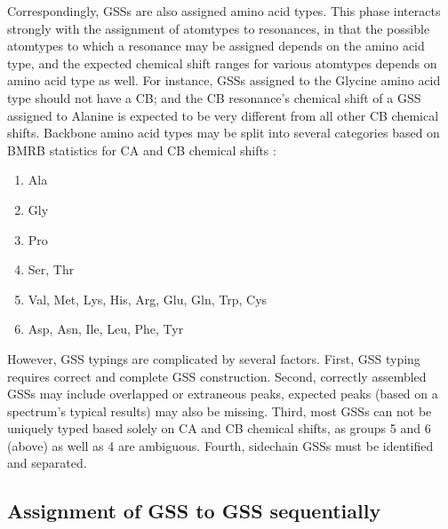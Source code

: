 Correspondingly, GSSs are also assigned amino acid types.  This phase 
interacts strongly with the assignment of atomtypes to resonances, in 
that the possible atomtypes to which a resonance may be assigned depends 
on the amino acid type, and the expected chemical shift ranges for various 
atomtypes depends on amino acid type as well.  For instance, GSSs assigned 
to the Glycine amino acid type should not have a CB; and the CB resonance's 
chemical shift of a GSS assigned to Alanine is expected to be very different 
from all other CB chemical shifts.  Backbone amino acid types may be split 
into several categories \cite{saga} based on BMRB statistics for 
CA and CB chemical shifts \cite{bmrb}:
\begin{enumerate}
  \item Ala
  \item Gly 
  \item Pro
  \item Ser, Thr
  \item Val, Met, Lys, His, Arg, Glu, Gln, Trp, Cys
  \item Asp, Asn, Ile, Leu, Phe, Tyr
\end{enumerate}
However, GSS typings are complicated by several factors.  First, GSS typing 
requires correct and complete GSS construction.  Second, correctly assembled 
GSSs may include overlapped or extraneous peaks, expected peaks (based on a 
spectrum's typical results) may also be missing.  Third, most GSSs can not 
be uniquely typed based solely on CA and CB chemical shifts, as groups 5 and 
6 (above) as well as 4 are ambiguous.  Fourth, sidechain GSSs must be 
identified and separated.

\subsection{Assignment of GSS to GSS sequentially}

